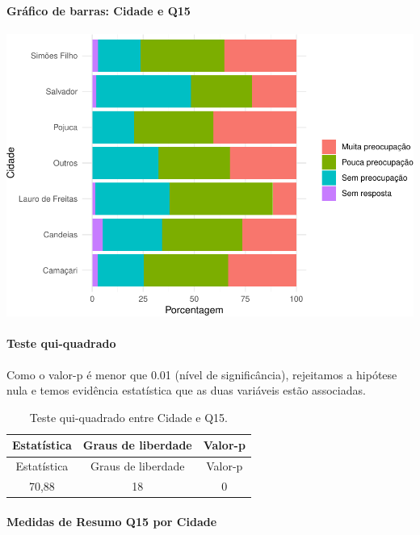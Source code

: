 \documentclass[]{article}
\let\oldparagraph\paragraph
\renewcommand{\paragraph}[1]{\oldparagraph{#1}\mbox{}}
\begin{document}
\hypertarget{gruxe1fico-de-barras-cidade-e-q15}{%
\paragraph{Gráfico de barras: Cidade e Q15}\label{gruxe1fico-de-barras-cidade-e-q15}}

\begin{center}\includegraphics[width=0.75\linewidth]{relatorio_covid19_files/figure-latex/unnamed-chunk-73-1} \end{center}

\hypertarget{teste-qui-quadrado-7}{%
\paragraph{Teste qui-quadrado}\label{teste-qui-quadrado-7}}

Como o valor-p é menor que 0.01 (nível de significância), rejeitamos a hipótese nula e temos evidência estatística que as duas variáveis estão associadas.

\begin{longtable}[]{@{}ccc@{}}
\caption{\label{tab:unnamed-chunk-75}Teste qui-quadrado entre Cidade e Q15.}\tabularnewline
\toprule
Estatística & Graus de liberdade & Valor-p\tabularnewline
\midrule
\endfirsthead
\toprule
Estatística & Graus de liberdade & Valor-p\tabularnewline
\midrule
\endhead
70,88 & 18 & 0\tabularnewline
\bottomrule
\end{longtable}

\cleardoublepage

\hypertarget{medidas-de-resumo-q15-por-cidade}{%
\paragraph{Medidas de Resumo Q15 por Cidade}\label{medidas-de-resumo-q15-por-cidade}}
\end{document}

